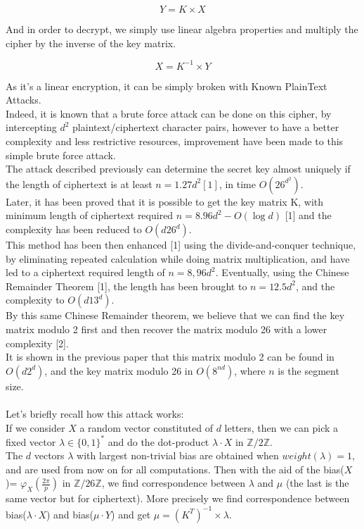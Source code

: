 \documentclass{article}
\begin{document}
$$Y=K \times X$$

And in order to decrypt, we simply use linear algebra properties and multiply the cipher by the inverse of the key matrix.

$$X = K^{-1} \times Y$$

As it's a linear encryption, it can be simply broken with Known PlainText Attacks.\\
Indeed, it is known that a brute force attack can be done on this cipher, by intercepting $d^2$ plaintext/ciphertext character pairs, however to have a better complexity and less restrictive resources, improvement have been made to this simple brute force attack.\\
The attack described previously can determine the secret key almost uniquely if the length of ciphertext is at least $n =1.27d^2 [1]$, in time $O(26^{d^2})$.\\ 
Later, it has been proved that it is possible to get the key matrix K, with minimum length of ciphertext required $n =8.96d^2 -O(\log d)$ [1] and the complexity has been reduced to $O(d26^d)$.\\
This method has been then enhanced [1] using the divide-and-conquer technique, by eliminating repeated calculation while doing matrix multiplication, and have led to a ciphertext required length of $n=8,96d^2$. Eventually, using the Chinese Remainder Theorem [1], the length has been brought to $n=12.5d^2$, and the complexity to $O(d13^d)$.\\
By this same Chinese Remainder theorem, we believe that we can find the key matrix modulo 2 first and then recover the matrix modulo 26 with a lower complexity [2].\\
It is shown in the previous paper that this matrix modulo 2 can be found in $O(d2^d)$, and the key matrix modulo 26 in $O(8^{nd})$, where $n$ is the segment size.\\
\\
Let's briefly recall how this attack works:\\
If we consider $X$ a random vector constituted of $d$ letters, then we can pick a fixed vector $\lambda \in \{0,1\}^*$ and do the dot-product $\lambda \cdot X$ in $\mathbb{Z}/2\mathbb{Z}$.\\
The $d$ vectors $\lambda$ with largest non-trivial bias are obtained when $weight(\lambda) = 1$, and are used from now on for all computations.
Then with the aid of the bias($X$)= $\varphi_{X}(\frac{2\pi}{p})$ in $\mathbb{Z}/26\mathbb{Z}$, we find correspondence between $\lambda$ and $\mu$ (the last is the same vector but for ciphertext). More precisely we find correspondence between bias($\lambda \cdot X$) and bias($\mu \cdot Y$) and get $ \mu = (K^T)^{-1} \times\lambda $.\\
\end{document}
